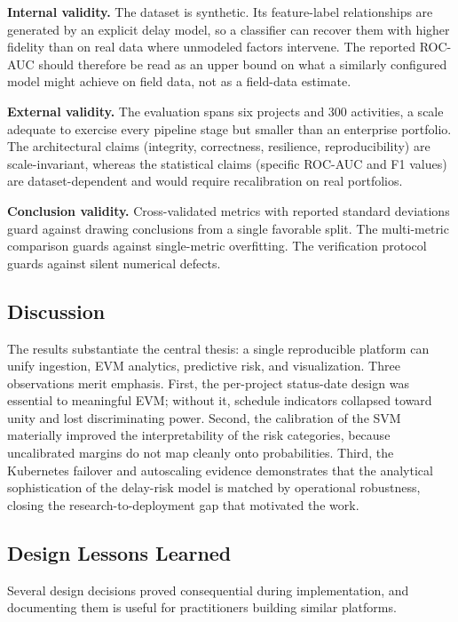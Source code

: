 \documentclass[conference]{IEEEtran}
\begin{document}
\textbf{Internal validity.} The dataset is synthetic. Its feature-label relationships are generated by an explicit delay model, so a classifier can recover them with higher fidelity than on real data where unmodeled factors intervene. The reported ROC-AUC should therefore be read as an upper bound on what a similarly configured model might achieve on field data, not as a field-data estimate.

\textbf{External validity.} The evaluation spans six projects and 300 activities, a scale adequate to exercise every pipeline stage but smaller than an enterprise portfolio. The architectural claims (integrity, correctness, resilience, reproducibility) are scale-invariant, whereas the statistical claims (specific ROC-AUC and F1 values) are dataset-dependent and would require recalibration on real portfolios.

\textbf{Conclusion validity.} Cross-validated metrics with reported standard deviations guard against drawing conclusions from a single favorable split. The multi-metric comparison guards against single-metric overfitting. The verification protocol guards against silent numerical defects.

\subsection{Discussion}

The results substantiate the central thesis: a single reproducible platform can unify ingestion, EVM analytics, predictive risk, and visualization. Three observations merit emphasis. First, the per-project status-date design was essential to meaningful EVM; without it, schedule indicators collapsed toward unity and lost discriminating power. Second, the calibration of the SVM materially improved the interpretability of the risk categories, because uncalibrated margins do not map cleanly onto probabilities. Third, the Kubernetes failover and autoscaling evidence demonstrates that the analytical sophistication of the delay-risk model is matched by operational robustness, closing the research-to-deployment gap that motivated the work.

\subsection{Design Lessons Learned}

Several design decisions proved consequential during implementation, and documenting them is useful for practitioners building similar platforms.
\end{document}
